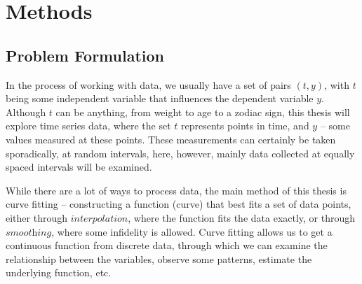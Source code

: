\documentclass[11pt,leqno]{book}
\theoremstyle{definition}
\theoremstyle{plain}
\theoremstyle{definition}
\begin{document}
{\chapter{Methods}
\section{Problem Formulation}
In the process of working with data, we usually have a set of pairs ${(t, y)}$, with ${t}$ being some independent variable that influences the dependent variable ${y}$. Although ${t}$ can be anything, from weight to age to a zodiac sign, this thesis will explore time series data, where the set ${t}$ represents points in time, and ${y}$ -- some values measured at these points. These measurements can certainly be taken sporadically, at random intervals, here, however, mainly data collected at equally spaced intervals will be examined.

While there are a lot of ways to process data, the main method of this thesis is curve fitting -- constructing a function (curve) that best fits a set of data points, either through $\textit{interpolation}$, where the function fits the data exactly, or through $\textit{smoothing}$, where some infidelity is allowed. Curve fitting allows us to get a continuous function from discrete data, through which we can examine the relationship between the variables, observe some patterns, estimate the underlying function, etc.

}
\end{document}
